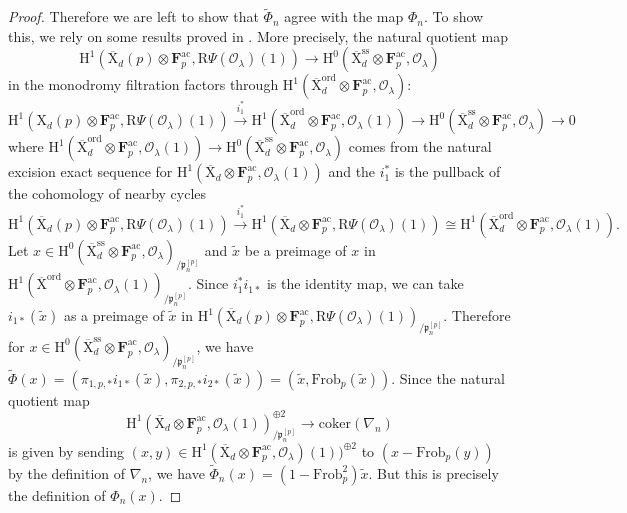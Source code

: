 \documentclass[10pt]{amsart}
\numberwithin{equation}{section}
\theoremstyle{plain}
\numberwithin{equation}{section}
\theoremstyle{definition}
\theoremstyle{remark}
\def\ord{\mathrm{ord}}
\def\coker{\mathrm{coker}}
\def\Frob{\mathrm{Frob}}
\def\ac{\mathrm{ac}}
\def\ss{\mathrm{ss}}
\def\ac{\mathrm{ac}}
\def\calO{\mathcal{O}}
\def\frakp{\mathfrak{p}}
\def\FF{\mathbf{F}}
\def\rmH{\mathrm{H}}
\def\rmX{\mathrm{X}}
\def\rmXbar{\overline{\rmX}}
\def\rmR{\mathrm{R}}
\begin{document}
\begin{proof}
Therefore we are left to show that $\widetilde{\Phi}_{n}$ agree with the map $\Phi_{n}$. To show this, we rely on some results proved in \cite[Proposition 1.5]{Illusie2}. More precisely, the natural quotient map 
\begin{equation*}
\rmH^{1}(\rmXbar_{d}(p)\otimes{\FF^{\ac}_{p}}, \rmR\Psi(\calO_{\lambda})(1))\rightarrow \rmH^{0}(\overline{\rmX}^{\ss}_{d}\otimes{\FF^{\ac}_{p}}, \calO_{\lambda})
\end{equation*}
in the monodromy filtration factors through $\rmH^{1}(\overline{\rmX}^{\ord}_{d}\otimes{\FF^{\ac}_{p}}, \calO_{\lambda})$:
\begin{equation*}
\rmH^{1}(\rmX_{d}(p)\otimes{\FF^{\ac}_{p}},\rmR\Psi (\calO_{\lambda})(1))\xrightarrow{i^{*}_{1}}\rmH^{1}(\overline{\rmX}^{\ord}_{d}\otimes{\FF^{\ac}_{p}}, \calO_{\lambda}(1)) \rightarrow \rmH^{0}(\overline{\rmX}^{\ss}_{d}\otimes{\FF^{\ac}_{p}}, \calO_{\lambda})\rightarrow 0
\end{equation*}
where $\rmH^{1}(\overline{\rmX}^{\ord}_{d}\otimes{\FF^{\ac}_{p}}, \calO_{\lambda}(1)) \rightarrow \rmH^{0}(\overline{\rmX}^{\ss}_{d}\otimes{\FF^{\ac}_{p}}, \calO_{\lambda})$ comes from the natural excision exact sequence for  $\rmH^{1}(\overline{\rmX}_{d}\otimes{\FF^{\ac}_{p}}, \calO_{\lambda}(1))$ and the $i^{*}_{1}$ is the pullback of the cohomology of nearby cycles
\begin{equation*}
\rmH^{1}(\overline{\rmX}_{d}(p)\otimes{\FF^{\ac}_{p}}, \rmR\Psi(\calO_{\lambda})(1))\xrightarrow{i^{*}_{1}}\rmH^{1}(\overline{\rmX}_{d}\otimes{\FF^{\ac}_{p}},\rmR\Psi(\calO_{\lambda})(1))\cong\rmH^{1}(\overline{\rmX}^{\ord}_{d}\otimes{\FF^{\ac}_{p}},\calO_{\lambda}(1)).
\end{equation*}
Let $x\in \rmH^{0}(\overline{\rmX}^{\ss}_{d}\otimes{\FF^{\ac}_{p}}, \calO_{\lambda})_{/\frakp^{[p]}_{n}}$ and $\tilde{x}$ be a preimage of $x$ in $\rmH^{1}(\overline{\rmX}^{\ord}\otimes{\FF^{\ac}_{p}}, \calO_{\lambda}(1))_{/\frakp^{[p]}_{n}}$. Since $i^{*}_{1}i_{1*}$ is the identity map, we can  take $i_{1*}(\tilde{x})$ as a preimage of $\tilde{x}$ in $\rmH^{1}(\overline{\rmX}_{d}(p)\otimes{\FF^{\ac}_{p}}, \rmR\Psi(\calO_{\lambda})(1))_{/\frakp^{[p]}_{n}}$. Therefore for $x\in \rmH^{0}(\overline{\rmX}^{\ss}_{d}\otimes{\FF^{\ac}_{p}}, \calO_{\lambda})_{/\frakp^{[p]}_{n}}$, we have $\widetilde{\Phi}(x)=(\pi_{1, p,*}i_{1*}(\tilde{x}), \pi_{2,p,*}i_{2*}(\tilde{x}))=(\tilde{x}, \Frob_{p}(\tilde{x}))$. Since the natural quotient map 
\begin{equation*}
\rmH^{1}(\rmXbar_{d}\otimes{\FF^{\ac}_{p}}, \calO_{\lambda}(1))_{/\frakp^{[p]}_{n}}^{\oplus 2} \rightarrow \coker(\nabla_{n})
\end{equation*}
is given by sending $(x, y)\in \rmH^{1}(\rmXbar_{d}\otimes{\FF^{\ac}_{p}}, \calO_{\lambda})(1))^{\oplus 2}$  to $(x-\Frob_{p}(y))$ by the definition of $\nabla_{n}$, we have 
$\widetilde{\Phi}_{n}(x)=(1-\Frob^{2}_{p})\tilde{x}$. But this is precisely the definition of  $\Phi_{n}(x)$. 
\end{proof}
\end{document}
